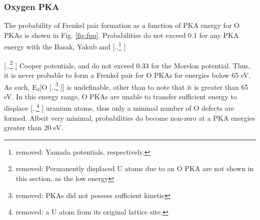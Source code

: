 \documentclass[review]{elsarticle} %
\providecommand{\DIFaddtex}[1]{{\protect\color{blue} \sf #1}} %
\providecommand{\DIFdeltex}[1]{{\protect\color{red} [..\footnote{removed: #1} ]}} %
\providecommand{\DIFaddbegin}{} %
\providecommand{\DIFaddend}{} %
\providecommand{\DIFdelbegin}{} %
\providecommand{\DIFdelend}{} %
\providecommand{\DIFadd}[1]{\texorpdfstring{\DIFaddtex{#1}}{#1}} %
\providecommand{\DIFdel}[1]{\texorpdfstring{\DIFdeltex{#1}}{}} %
\newcommand{\DIFscaledelfig}{0.5}
\newlength{\DIFdelgraphicswidth} %
\newlength{\DIFdelgraphicsheight} %
\newcommand{\DIFaddincludegraphics}[2][]{{\color{blue}\fbox{\DIFOincludegraphics[#1]{#2}}}} %
\newcommand{\DIFdelincludegraphics}[2][]{%
\sbox{\DIFdelgraphicsbox}{\DIFOincludegraphics[#1]{#2}}%
\settoboxwidth{\DIFdelgraphicswidth}{\DIFdelgraphicsbox} %
\settoboxtotalheight{\DIFdelgraphicsheight}{\DIFdelgraphicsbox} %
\scalebox{\DIFscaledelfig}{%
\parbox[b]{\DIFdelgraphicswidth}{\usebox{\DIFdelgraphicsbox}\\[-\baselineskip] \rule{\DIFdelgraphicswidth}{0em}}\llap{\resizebox{\DIFdelgraphicswidth}{\DIFdelgraphicsheight}{%
\setlength{\unitlength}{\DIFdelgraphicswidth}%
\begin{picture}(1,1)%
\thicklines\linethickness{2pt} %
{\color[rgb]{1,0,0}\put(0,0){\framebox(1,1){}}}%
{\color[rgb]{1,0,0}\put(0,0){\line( 1,1){1}}}%
{\color[rgb]{1,0,0}\put(0,1){\line(1,-1){1}}}%
\end{picture}%
}\hspace*{3pt}}} %
} %
\DeclareRobustCommand{\DIFaddbegin}{\DIFOaddbegin \let\includegraphics\DIFaddincludegraphics} %
\DeclareRobustCommand{\DIFaddend}{\DIFOaddend \let\includegraphics\DIFOincludegraphics} %
\DeclareRobustCommand{\DIFdelbegin}{\DIFOdelbegin \let\includegraphics\DIFdelincludegraphics} %
\DeclareRobustCommand{\DIFdelend}{\DIFOaddend \let\includegraphics\DIFOincludegraphics} %
\begin{document}
\FloatBarrier

\subsubsection{\DIFadd{Oxygen PKA}}

\DIFadd{The probability of Frenkel pair formation as a function of PKA energy for O PKAs is shown in Fig. \ref{fig:fpo}. Probabilities do not exceed 0.1 for any PKA energy with }\DIFaddend the Basak, Yakub and \DIFdelbegin \DIFdel{Yamada potentials, respectively. }%

\DIFdel{Permanently displaced U atoms due to an O PKA are not shown in this section, as the low energy }\DIFdelend \DIFaddbegin \DIFadd{Cooper potentials, and do not exceed 0.33 for the Morelon potential. Thus, it is never probable to form a Frenkel pair for O PKAs for energies below 65 eV. As such, E$_d$}[\DIFaddend O\DIFdelbegin \DIFdel{PKAs did not possess sufficient kinetic }\DIFdelend \DIFaddbegin ] \DIFadd{is undefinable, other than to note that it is greater than 65 eV. In this energy range, O PKAs are unable to transfer sufficient }\DIFaddend energy to displace \DIFdelbegin \DIFdel{a U atom from its original lattice site. }\DIFdelend \DIFaddbegin \DIFadd{uranium atoms, thus only a minimal number of O defects are formed. Albeit very minimal, probabilities do become non-zero at a PKA energies greater than 20 eV.
}\DIFaddend 
\end{document}
